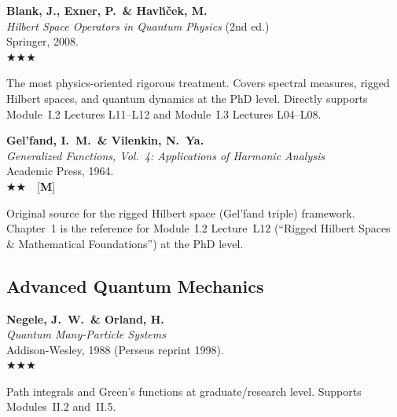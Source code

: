 \documentclass[11pt,a4paper]{article}
\newcommand{\essential}{$\bigstar\bigstar\bigstar$}
\newcommand{\recommended}{$\bigstar\bigstar$}
\newenvironment{bibentry}[1]{%
  \begin{tcolorbox}[entrybox=#1, top=4pt, bottom=4pt]%
}{%
  \end{tcolorbox}\smallskip%
}
\begin{document}
\begin{bibentry}{t5light}
\textbf{Blank, J., Exner, P.\ \& Havl\'{\i}\v{c}ek, M.}\\
\textit{Hilbert Space Operators in Quantum Physics} (2nd ed.)\\
Springer, 2008.\\[4pt]
\essential\\[4pt]
\begin{tcolorbox}[annotbox]
The most physics-oriented rigorous treatment. Covers spectral measures, rigged
Hilbert spaces, and quantum dynamics at the PhD level. Directly supports
Module~I.2 Lectures L11--L12 and Module~I.3 Lectures L04--L08.
\end{tcolorbox}
\end{bibentry}

\begin{bibentry}{t5light}
\textbf{Gel'fand, I.~M.\ \& Vilenkin, N.~Ya.}\\
\textit{Generalized Functions, Vol.~4: Applications of Harmonic Analysis}\\
Academic Press, 1964.\\[4pt]
\recommended\ \ [\textbf{M}]\\[4pt]
\begin{tcolorbox}[annotbox]
Original source for the rigged Hilbert space (Gel'fand triple) framework.
Chapter~1 is the reference for Module~I.2 Lecture~L12 (``Rigged Hilbert Spaces
\& Mathematical Foundations'') at the PhD level.
\end{tcolorbox}
\end{bibentry}

\subsection{Advanced Quantum Mechanics}

\begin{bibentry}{t5light}
\textbf{Negele, J.~W.\ \& Orland, H.}\\
\textit{Quantum Many-Particle Systems}\\
Addison-Wesley, 1988 (Perseus reprint 1998).\\[4pt]
\essential\\[4pt]
\begin{tcolorbox}[annotbox]
Path integrals and Green's functions at graduate/research level. Supports
Modules~II.2 and~II.5.
\end{tcolorbox}
\end{bibentry}
\end{document}
